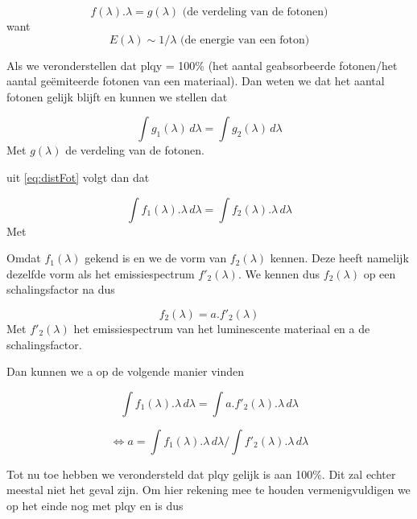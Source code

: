 \begin{equation}
    f(\lambda).\lambda = g(\lambda) \text{ (de verdeling van de fotonen)} \label{eq:distFot}
\end{equation}
want
\begin{equation}
    E(\lambda) \sim 1/\lambda \text{ (de energie van een foton)}
\end{equation}

Als we veronderstellen dat \gls{plqy} = 100\% (het aantal geabsorbeerde fotonen/het aantal ge\"emiteerde fotonen van een materiaal). Dan weten we dat het aantal fotonen gelijk blijft en kunnen we stellen dat

\begin{equation}
    \int g_1(\lambda) \, d\lambda = \int g_2(\lambda) \, d\lambda
\end{equation}
Met $g(\lambda)$ de verdeling van de fotonen.

uit \ref{eq:distFot} volgt dan dat

\begin{equation}
    \int f_1(\lambda).\lambda \, d\lambda = \int f_2(\lambda).\lambda \, d\lambda
\end{equation}
Met 

Omdat $f_1(\lambda)$ gekend is en we de vorm van $f_2(\lambda)$ kennen. Deze heeft namelijk dezelfde vorm als het emissiespectrum $f'_2(\lambda)$. We kennen dus $f_2(\lambda)$ op een schalingsfactor na dus

\begin{equation}
    f_2(\lambda) = a.f'_2(\lambda)
\end{equation}
Met $f'_2(\lambda)$ het emissiespectrum van het luminescente materiaal en a de schalingsfactor.

Dan kunnen we a op de volgende manier vinden

\begin{equation}
    \int f_1(\lambda).\lambda \, d\lambda = \int a.f'_2(\lambda).\lambda \, d\lambda
\end{equation}

\begin{equation}
    \Leftrightarrow
    a = \int f_1(\lambda).\lambda \, d\lambda / \int f'_2(\lambda).\lambda \, d\lambda
\end{equation}

Tot nu toe hebben we verondersteld dat \gls{plqy} gelijk is aan 100\%. Dit zal echter meestal niet het geval zijn. Om hier rekening mee te houden vermenigvuldigen we op het einde nog met \gls{plqy} en is dus

